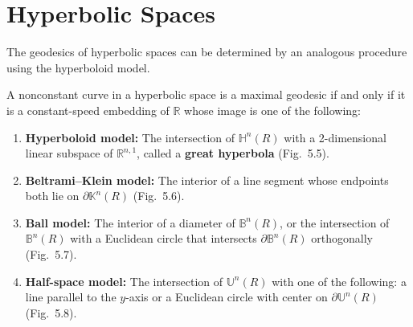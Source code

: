 \section{Hyperbolic Spaces}


The geodesics of hyperbolic spaces can be determined by an analogous procedure using the hyperboloid model.

\begin{proposition}
\label{prop:geodesics-hyperbolic-spaces}

A nonconstant curve in a hyperbolic space is a maximal geodesic if and only if it is a constant-speed embedding of $\mathbb{R}$ whose image is one of the following:
\begin{enumerate}
\item[(a)] \textbf{Hyperboloid model:} The intersection of $\mathbb{H}^n(R)$ with a 2-dimensional linear subspace of $\mathbb{R}^{n,1}$, called a \textbf{great hyperbola} (Fig.\ 5.5).
\item[(b)] \textbf{Beltrami--Klein model:} The interior of a line segment whose endpoints both lie on $\partial\mathbb{K}^n(R)$ (Fig.\ 5.6).
\item[(c)] \textbf{Ball model:} The interior of a diameter of $\mathbb{B}^n(R)$, or the intersection of $\mathbb{B}^n(R)$ with a Euclidean circle that intersects $\partial \mathbb{B}^n(R)$ orthogonally (Fig.\ 5.7).
\item[(d)] \textbf{Half-space model:} The intersection of $\mathbb{U}^n(R)$ with one of the following: a line parallel to the $y$-axis or a Euclidean circle with center on $\partial \mathbb{U}^n(R)$ (Fig.\ 5.8).
\end{enumerate}
\end{proposition}


